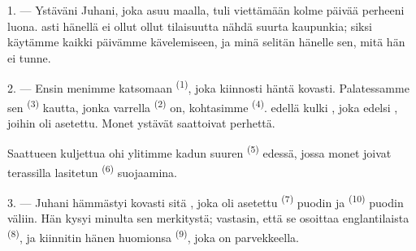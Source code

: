 %
%

\VUsaut{4.0mm}
\VUsaut{3.0mm}

\VUsaut{3.0mm}

1. --- Ystäväni Juhani, joka asuu maalla, tuli viettämään kolme päivää perheeni
luona.  asti hänellä ei ollut ollut tilaisuutta nähdä suurta
kaupunkia; siksi käytämme kaikki päivämme kävelemiseen, ja minä selitän hänelle
sen, mitä hän ei tunne.

2. --- Ensin menimme katsomaan  \textsuperscript{(1)},
joka kiinnosti häntä kovasti. Palatessamme sen 
\textsuperscript{(3)} kautta, jonka varrella 
\textsuperscript{(2)} on, kohtasimme 
\textsuperscript{(4)}.  edellä kulki ,
joka edelsi , joihin  oli asetettu. Monet
ystävät saattoivat  perhettä.

Saattueen kuljettua ohi ylitimme kadun suuren 
\textsuperscript{(5)} edessä, jossa monet  joivat
 terassilla lasitetun  \textsuperscript{(6)}
suojaamina.

3. --- Juhani hämmästyi kovasti sitä , joka oli asetettu
 \textsuperscript{(7)} puodin ja
 \textsuperscript{(10)} puodin väliin. Hän kysyi
minulta sen merkitystä; vastasin, että se osoittaa englantilaista
 \textsuperscript{(8)}, ja kiinnitin hänen huomionsa
 \textsuperscript{(9)}, joka on parvekkeella.

